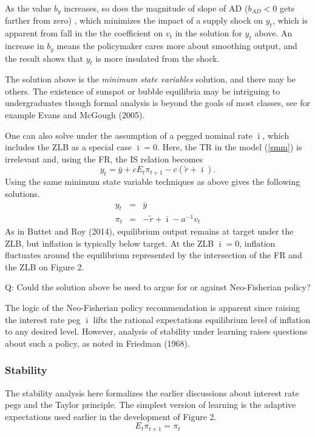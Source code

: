 \documentclass{article}
\begin{document}
\begin{doublespace}
As the value $b_{y}$ increases, so does the magnitude of slope of AD ($%
b_{AD}<0$ gets farther from zero) , which minimizes the impact of a supply
shock on $y_{t}$, which is apparent from fall in the the coefficient on $%
v_{t}$ in the solution for $y_{t}$ above. An increase in $b_{y}$ means the
policymaker cares more about smoothing output, and the result shows that $%
y_{t}$ is more insulated from the shock.

The solution above is the \textit{minimum state variables }solution, and
there may be others. The existence of sunspot or bubble equilibria may be
intriguing to undergraduates though formal analysis is beyond the goals of
most classes, see for example Evans and McGough (2005).

One can also solve under the assumption of a pegged nominal rate $\bar{\imath%
}$, which includes the ZLB as a special case $\bar{\imath}=0$. Here, the TR
in the model (\ref{smm}) is irrelevant and, using the FR, the IS relation
becomes%
\begin{equation*}
y_{t}=\bar{y}+cE_{t}\pi _{t+1}-c\left( \widetilde{r}+\bar{\imath}\right) .
\end{equation*}%
Using the same minimum state variable techniques as above gives the
following solutions.%
\begin{eqnarray*}
y_{t} &=&\bar{y} \\
\pi _{t} &=&-\widetilde{r}+\bar{\imath}-a^{-1}v_{t}
\end{eqnarray*}%
As in Buttet and Roy (2014), equilibrium output remains at target under the
ZLB, but inflation is typically below target. At the ZLB $\bar{\imath}=0$,
inflation fluctuates around the equilibrium represented by the intersection
of the FR and the ZLB on Figure 2.

Q: Could the solution above be used to argue for or against Neo-Fisherian
policy?

The logic of the Neo-Fisherian policy recommendation is apparent since
raising the interest rate peg $\bar{\imath}$ lifts the rational expectations
equilibrium level of inflation to any desired level. However, analysis of
stability under learning raises questions about such a policy, as noted in
Friedman (1968).

\subsubsection{Stability}

The stability analysis here formalizes the earlier discussions about
interest rate pegs and the Taylor principle. The simplest version of
learning is the adaptive expectations used earlier in the development of
Figure 2.%
\begin{equation*}
E_{t}\pi _{t+1}=\pi _{t}
\end{equation*}


\end{doublespace}
\end{document}
